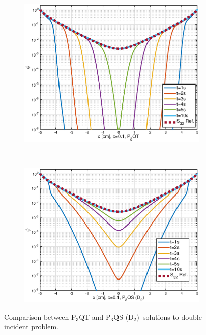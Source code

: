 \documentclass[review]{elsarticle}
\begin{document}
\begin{figure}[ht!]
	\begin{subfigure}{.9\textwidth}
		\centering
		\includegraphics[width=1\linewidth]{brunner_p3qt.eps}
	\end{subfigure}
	~
	\begin{subfigure}{.9\textwidth}
		\centering
		\includegraphics[width=1\linewidth]{brunner_p3qs.eps}
	\end{subfigure}
	\caption{Comparison between P$_3$QT and P$_3$QS (D$_2$)~solutions to double incident problem.}
	\label{exp}
\end{figure}
\end{document}
